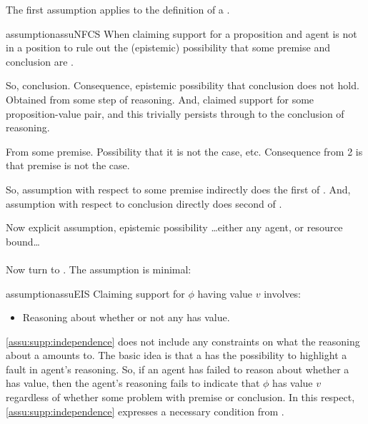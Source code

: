 \begin{note}
  The first assumption applies \ideaCSA{} to the definition of a \requ{}.

  \begin{restatable}[\nfcs{--} -- \nfcs{}]{assumption}{assuNFCS}\label{assu:supp:nfactive}
    When claiming support for a proposition and agent is not in a position to rule out the (epistemic) possibility that some premise and conclusion are .
  \end{restatable}

  So, conclusion.
  Consequence, epistemic possibility that conclusion does not hold.
  Obtained from some step of reasoning.
  And, claimed support for some proposition-value pair, and this trivially persists through to the conclusion of reasoning.

  From some premise.
  Possibility that it is not the case, etc.
  Consequence from 2 is that premise is not the case.

  So, assumption with respect to some premise indirectly does the first of \ideaCSA{}.
  And, assumption with respect to conclusion directly does second of \ideaCSA{}.
\end{note}

\begin{note}
  Now explicit assumption, epistemic possibility \dots either any agent, or resource bound\dots
\end{note}

\paragraph{\ideaCSB{}}

\begin{note}
  Now turn to \ideaCSB{}.
  The assumption is minimal:
\end{note}

\begin{note}
  \begin{restatable}[\eiS{-} --- \eiS{}]{assumption}{assuEIS}\label{assu:supp:independence}
    Claiming support for \(\phi\) having value \(v\) involves:
    \begin{itemize}
    \item Reasoning about whether or not any \requ{} has value.
    \end{itemize}
    \vspace{-\baselineskip}
  \end{restatable}
  \autoref{assu:supp:independence} does not include any constraints on what the reasoning about a \requ{} amounts to.
  The basic idea is that a \requ{} has the possibility to highlight a fault in agent's reasoning.
  So, if an agent has failed to reason about whether a \requ{} has {\color{red} value}, then the agent's reasoning fails to indicate that \(\phi\) has value \(v\) regardless of whether {\color{red} some problem with premise or conclusion}.
  In this respect, \autoref{assu:supp:independence} expresses a necessary condition from \ideaCSB{}.
\end{note}

